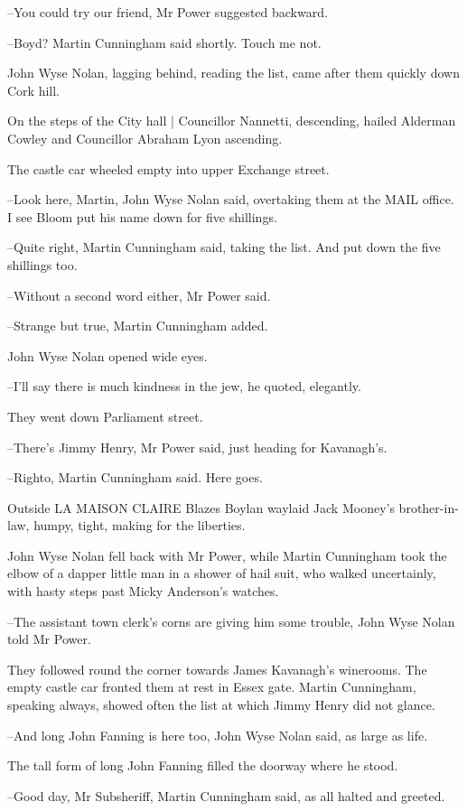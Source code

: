 --You could try our friend, Mr Power suggested backward.

--Boyd? Martin Cunningham said shortly. Touch me not.

John Wyse Nolan, lagging behind, reading the list, came after them
quickly down Cork hill.

On the steps of the City hall |
Councillor Nannetti, descending, hailed
Alderman Cowley and Councillor Abraham Lyon ascending.

The castle car wheeled empty into upper Exchange street.

--Look here, Martin, John Wyse Nolan said, overtaking them at the MAIL
office. I see Bloom put his name down for five shillings.

--Quite right, Martin Cunningham said, taking the list. And put down the
five shillings too.

--Without a second word either, Mr Power said.

--Strange but true, Martin Cunningham added.

John Wyse Nolan opened wide eyes.

--I'll say there is much kindness in the jew,
he quoted, elegantly.

They went down Parliament street.

--There's Jimmy Henry, Mr Power said, just heading for Kavanagh's.

--Righto, Martin Cunningham said. Here goes.

Outside LA MAISON CLAIRE Blazes Boylan waylaid Jack Mooney's brother-in-
law, humpy, tight, making for the liberties.

John Wyse Nolan fell back with Mr Power, while Martin Cunningham took the
elbow of a dapper little man in a shower of hail suit, who walked
uncertainly, with hasty steps past Micky Anderson's watches.

--The assistant town clerk's corns are giving him some trouble,
John Wyse Nolan told Mr Power.%

They followed round the corner towards James Kavanagh's winerooms. The
empty castle car fronted them at rest in Essex gate. Martin Cunningham,
speaking always, showed often the list at which Jimmy Henry did not
glance.

--And long John Fanning is here too, John Wyse Nolan said, as large as
life.

The tall form of long John Fanning filled the doorway where he stood.

--Good day, Mr Subsheriff, Martin Cunningham said,
as all halted and greeted.%


